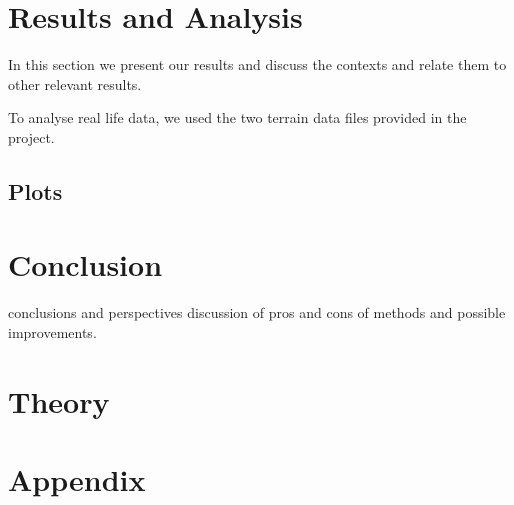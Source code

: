\documentclass[sigconf, nonacm]{acmart}
\begin{document}
\section{Results and Analysis}
In this section we present our results and discuss the contexts and relate them to other relevant results.

To analyse real life data, we used the two terrain data files provided in the project.
\subsection{Plots}
\section{Conclusion}
conclusions and perspectives
discussion of pros and cons of methods and possible improvements.

\section*{Theory}

\section*{Appendix}

\begin{acks}

\end{acks}




\end{document}
